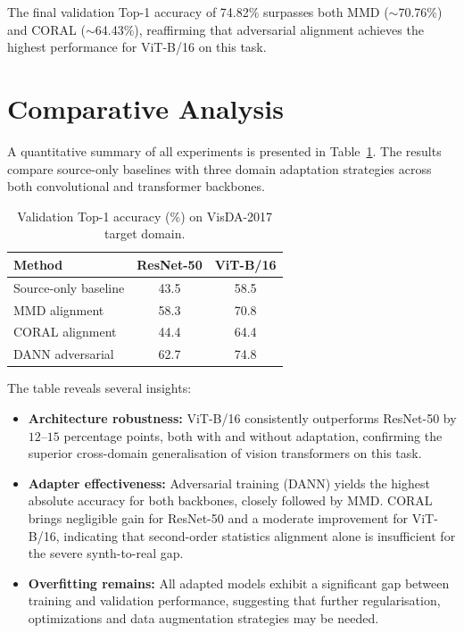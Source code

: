 \documentclass[a4paper,12pt]{extarticle}
\begin{document}
The final validation Top-1 accuracy of 74.82\% surpasses both MMD (\(\sim\)70.76\%) and CORAL (\(\sim\)64.43\%),
reaffirming that adversarial alignment achieves the highest performance for ViT-B/16 on this task.

\section{Comparative Analysis}
\label{sec:comparison}

A quantitative summary of all experiments is presented in Table~\ref{tab:results_summary}. The results compare
source-only baselines with three domain adaptation strategies across both convolutional and transformer backbones.

\begin{table}[H]
	\centering
	\caption{Validation Top-1 accuracy (\%) on VisDA-2017 target domain.}
	\label{tab:results_summary}
	\begin{tabular}{lcc}
		\toprule
		\textbf{Method}      & \textbf{ResNet-50} & \textbf{ViT-B/16} \\
		\midrule
		Source-only baseline & 43.5               & 58.5              \\
		MMD alignment        & 58.3               & 70.8              \\
		CORAL alignment      & 44.4               & 64.4              \\
		DANN adversarial     & 62.7               & 74.8              \\
		\bottomrule
	\end{tabular}
\end{table}

The table reveals several insights:
\begin{itemize}
	\item \textbf{Architecture robustness:} ViT-B/16 consistently outperforms ResNet-50 by $12$--$15$ percentage points,
	      both with and without adaptation, confirming the superior cross-domain generalisation of vision transformers on this task.
	\item \textbf{Adapter effectiveness:} Adversarial training (DANN) yields the highest absolute accuracy for both backbones,
	      closely followed by MMD. CORAL brings negligible gain for ResNet-50 and a moderate improvement for ViT-B/16, indicating
	      that second-order statistics alignment alone is insufficient for the severe synth-to-real gap.
	\item \textbf{Overfitting remains:} All adapted models exhibit a significant gap between training and validation performance,
	      suggesting that further regularisation, optimizations and  data augmentation strategies may be needed.
\end{itemize}
\end{document}
